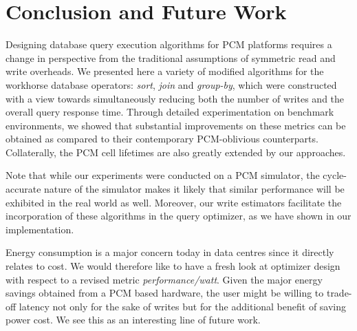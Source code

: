 \section{Conclusion and Future Work}
\label{conclusion}
Designing database query execution algorithms for PCM platforms
requires a change in perspective from the traditional assumptions of
symmetric read and write overheads.  We presented here a variety of
modified algorithms for the workhorse database operators: \emph{sort},
\emph{join} and \emph{group-by}, which were constructed with a view
towards simultaneously reducing both the number of writes and the
overall query response time. Through detailed experimentation on benchmark
environments, we showed that substantial improvements on these metrics can
be obtained as compared to their contemporary PCM-oblivious counterparts.
Collaterally, the PCM cell lifetimes are also greatly extended by our
approaches.

Note that while our experiments were conducted on a PCM simulator, the
cycle-accurate nature of the simulator makes it likely that similar
performance will be exhibited in the real world as well. Moreover,
our write estimators facilitate the incorporation of these algorithms
in the query optimizer, as we have shown in our implementation.

Energy consumption is a major concern today in data centres since it directly relates to cost. We would therefore like to have a fresh look at optimizer design with respect to a revised metric \emph{performance/watt}. Given the major energy savings obtained from a PCM based hardware, the user might be willing to trade-off latency not only for the sake of writes but for the additional benefit of saving power cost. We see this as an interesting line of future work.

\begin{comment}
Even within the class of PCM conscious algorithms, there exist myriad
algorithm design choices offering varying degrees of writes and running
time. Nested loops join, for example, would incur the least amount of
writes for join when both relations fit in PCM, but might prove to be
extremely slow. We need to come up with metrics that can quantify this
trade-off based upon some measure of the lifetime that the PCM memory
module is expected to serve and the maximum delay the user is willing to
bear. These metrics too need to be integrated with the query optimizer
for it to make suitable plan choices for PCM based hardware. We see this
as an interesting line of future work.
\end{comment}
